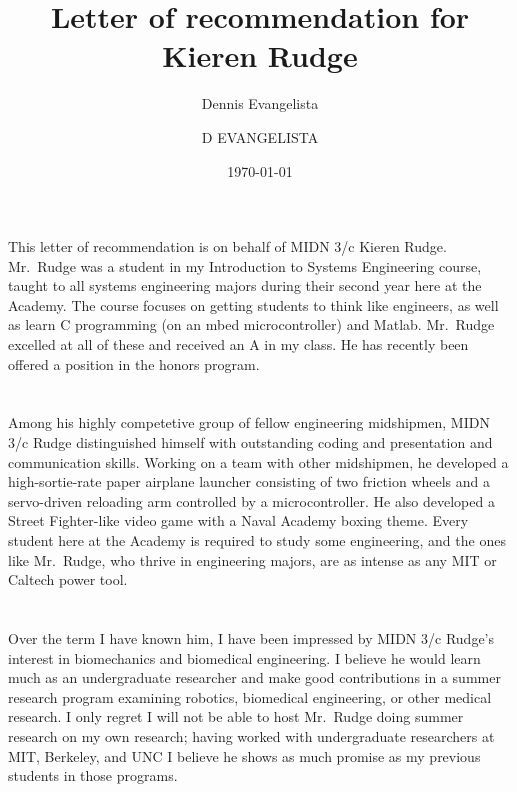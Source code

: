 \documentclass[12pt,courier]{navyletter}
\author{Dennis Evangelista}
\title{Letter of recommendation for Kieren Rudge}
\date{\today}
\begin{document}
\makedateblock{}

\begin{navyletterheader}
\navyskip{}%
\navysubjline%
\end{navyletterheader}

\section{}
This letter of recommendation is on behalf of MIDN 3/c Kieren Rudge.  Mr.~Rudge was a student in my Introduction to Systems Engineering course, taught to all systems engineering majors during their second year here at the Academy. The course focuses on getting students to think like engineers, as well as learn C programming (on an mbed microcontroller) and Matlab. Mr.~Rudge excelled at all of these and received an A in my class. He has recently been offered a position in the honors program. 

\section{} 
Among his highly competetive group of fellow engineering midshipmen, MIDN 3/c Rudge distinguished himself with outstanding coding and presentation and communication skills.  Working on a team with other midshipmen, he developed a high-sortie-rate paper airplane launcher consisting of two friction wheels and a servo-driven reloading arm controlled by a microcontroller.   He also developed a Street Fighter-like video game with a Naval Academy boxing theme.  Every student here at the Academy is required to study some engineering, and the ones like Mr.~Rudge, who thrive in engineering majors, are as intense as any MIT or Caltech power tool.  

\section{}
Over the term I have known him, I have been impressed by MIDN 3/c Rudge's interest in biomechanics and biomedical engineering.  I believe he would learn much as an undergraduate researcher and make good contributions in a summer research program examining robotics, biomedical engineering, or other medical research.  I only regret I will not be able to host Mr.~Rudge doing summer research on my own research; having worked with undergraduate researchers at MIT, Berkeley, and UNC I believe he shows as much promise as my previous students in those programs.


\noclosing{}\\
\noindent\hspace*{4in}
\signature{D EVANGELISTA}

\end{document}
